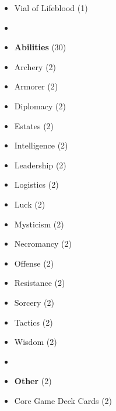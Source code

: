 \begin{multicols*}{3}
\begin{itemize}[leftmargin=0pt, label={}, noitemsep, noitemsep]
  \item Vial of Lifeblood (1)
  \item
  \item \textbf{Abilities} (30)
  \item Archery (2)
  \item Armorer (2)
  \item Diplomacy (2)
  \item Estates (2)
  \item Intelligence (2)
  \item Leadership (2)
  \item Logistics (2)
  \item Luck (2)
  \item Mysticism (2)
  \item Necromancy (2)
  \item Offense (2)
  \item Resistance (2)
  \item Sorcery (2)
  \item Tactics (2)
  \item Wisdom (2)
  \item
  \item \textbf{Other} (2)
  \item Core Game Deck Cards (2)
\end{itemize}

\end{multicols*}
